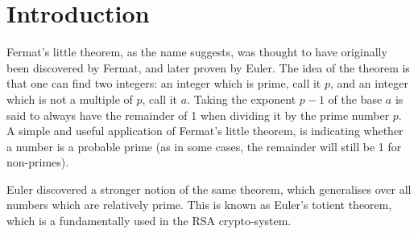 \section{Introduction}
Fermat's little theorem, as the name suggests, was thought to have originally been discovered by Fermat, and later proven by Euler. The idea of the theorem is that one can find two integers: an integer which is prime, call it $p$, and an integer which is not a multiple of $p$, call it $a$. Taking the exponent $p - 1$ of the base $a$ is said to always have the remainder of 1 when dividing it by the prime number $p$. A simple and useful application of Fermat's little theorem, is indicating whether a number is a probable prime (as in some cases, the remainder will still be 1 for non-primes).

Euler discovered a stronger notion of the same theorem, which generalises over all numbers which are relatively prime. This is known as Euler's totient theorem, which is a fundamentally used in the RSA crypto-system.

